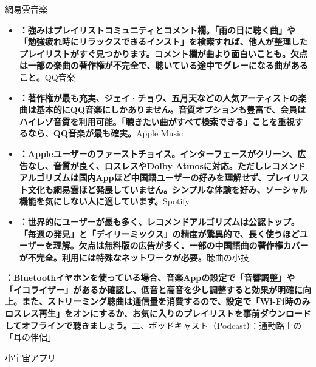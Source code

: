 


網易雲音楽

\begin{itemize}
  \item \textbf{：強みはプレイリストコミュニティとコメント欄。「雨の日に聴く曲」や「勉強疲れ時にリラックスできるインスト」を検索すれば、他人が整理したプレイリストがすぐ見つかります。コメント欄が曲より面白いことも。欠点は一部の楽曲の著作権が不完全で、聴いている途中でグレーになる曲があること。}QQ音楽
  \item \textbf{：著作権が最も充実、ジェイ·チョウ、五月天などの人気アーティストの楽曲は基本的にQQ音楽にしかありません。音質オプションも豊富で、会員はハイレゾ音質を利用可能。「聴きたい曲がすべて検索できる」ことを重視するなら、QQ音楽が最も確実。}Apple Music
  \item \textbf{：Appleユーザーのファーストチョイス。インターフェースがクリーン、広告なし、音質が良く、ロスレスやDolby Atmosに対応。ただしレコメンドアルゴリズムは国内Appほど中国語ユーザーの好みを理解せず、プレイリスト文化も網易雲ほど発展していません。シンプルな体験を好み、ソーシャル機能を気にしない人に適しています。}Spotify
  \item \textbf{：世界的にユーザーが最も多く、レコメンドアルゴリズムは公認トップ。「毎週の発見」と「デイリーミックス」の精度が驚異的で、長く使うほどユーザーを理解。欠点は無料版の広告が多く、一部の中国語曲の著作権カバーが不完全。利用には特殊なネットワークが必要。}聴曲の小技
\end{itemize}

\textbf{：Bluetoothイヤホンを使っている場合、音楽Appの設定で「音響調整」や「イコライザー」があるか確認し、低音と高音を少し調整すると効果が明確に向上。また、ストリーミング聴曲は通信量を消費するので、設定で「Wi-Fi時のみロスレス再生」をオンにするか、お気に入りのプレイリストを事前ダウンロードしてオフラインで聴きましょう。}二、ポッドキャスト（Podcast）：通勤路上の「耳の伴侶」


小宇宙アプリ

